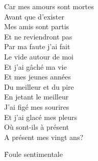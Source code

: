 \documentclass{novel}
\begin{document}
\begin{multicols}{2}
Car mes amours sont mortes \\
Avant que d'exister \\
Mes amis sont partis \\
Et ne reviendront pas \\
Par ma faute j'ai fait \\
Le vide autour de moi \\
Et j'ai gâché ma vie \\
Et mes jeunes années \\

Du meilleur et du pire \\
En jetant le meilleur \\
J'ai figé mes sourires \\
Et j'ai glacé mes pleurs \\
Où sont-ils à présent \\
A présent mes vingt ans? \\
\end{multicols}

\newpage
\normalsize

\h*{Foule sentimentale}
\end{document}
